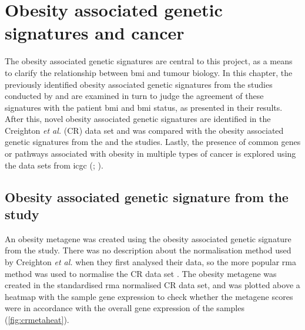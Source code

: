 \chapter{Obesity associated genetic signatures and cancer}
\label{cha:obesity_genetic_signatures_and_cancer}

The obesity associated genetic signatures are central to this project, as a means to clarify the relationship between \gls{bmi} and tumour biology.
In this chapter, the previously identified obesity associated genetic signatures from the studies conducted by \citet{Creighton2012} and \citet{Fuentes-Mattei2014} are examined in turn to judge the agreement of these signatures with the patient \gls{bmi} and \gls{bmi} status, as presented in their results.
After this, novel obesity associated genetic signatures are identified in the Creighton \textit{et al.} (CR) data set and was compared with the obesity associated genetic signatures from the \citet{Creighton2012} and the \citet{Fuentes-Mattei2014}  studies.
Lastly, the presence of common genes or pathways associated with obesity in multiple types of cancer is explored using the data sets from \gls{icgc} (; \citealp{Zhang2011}).

\section{Obesity associated genetic signature from the\\\citet{Creighton2012} study}
\label{sec:creighton_obesity_metagene}

An obesity metagene was created using the obesity associated genetic signature from the \citet{Creighton2012} study.
There was no description about the normalisation method used by Creighton \textit{et al.} when they first analysed their data, so the more popular \gls{rma} method  was used to  normalise the CR data set \citep{Irizarry2003}.
The obesity metagene was created in the standardised \gls{rma} normalised CR data set, and  was plotted above a heatmap with the sample gene expression  to check whether the metagene scores were in accordance with the overall gene expression of the samples (\cref{fig:crmetaheat}).

